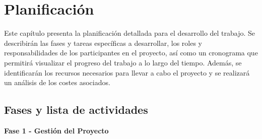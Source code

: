 \documentclass[a4paper, 11pt]{article}
\begin{document}
\clearpage

\section{Planificación}
\thispagestyle{nohead}
Este capítulo presenta la planificación detallada para el desarrollo del trabajo. Se describirán las fases y tareas específicas a desarrollar, los roles y responsabilidades de los participantes en el proyecto, así como un cronograma que permitirá visualizar el progreso del trabajo a lo largo del tiempo. Además, se identificarán los recursos necesarios para llevar a cabo el proyecto y se realizará un análisis de los costes asociados.


\subsection{Fases y lista de actividades}

\textbf{\large Fase 1 - Gestión del Proyecto} 
\end{document}
